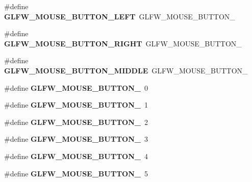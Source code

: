 \begin{DoxyCompactItemize}
\item 
\mbox{\label{group__buttons_gaf37100431dcd5082d48f95ee8bc8cd56}} 
\#define {\bfseries G\+L\+F\+W\+\_\+\+M\+O\+U\+S\+E\+\_\+\+B\+U\+T\+T\+O\+N\+\_\+\+L\+E\+FT}~G\+L\+F\+W\+\_\+\+M\+O\+U\+S\+E\+\_\+\+B\+U\+T\+T\+O\+N\+\_
\item 
\mbox{\label{group__buttons_ga3e2f2cf3c4942df73cc094247d275e74}} 
\#define {\bfseries G\+L\+F\+W\+\_\+\+M\+O\+U\+S\+E\+\_\+\+B\+U\+T\+T\+O\+N\+\_\+\+R\+I\+G\+HT}~G\+L\+F\+W\+\_\+\+M\+O\+U\+S\+E\+\_\+\+B\+U\+T\+T\+O\+N\+\_
\item 
\mbox{\label{group__buttons_ga34a4d2a701434f763fd93a2ff842b95a}} 
\#define {\bfseries G\+L\+F\+W\+\_\+\+M\+O\+U\+S\+E\+\_\+\+B\+U\+T\+T\+O\+N\+\_\+\+M\+I\+D\+D\+LE}~G\+L\+F\+W\+\_\+\+M\+O\+U\+S\+E\+\_\+\+B\+U\+T\+T\+O\+N\+\_
\item 
\mbox{\label{group__buttons_ga181a6e875251fd8671654eff00f9112e}} 
\#define {\bfseries G\+L\+F\+W\+\_\+\+M\+O\+U\+S\+E\+\_\+\+B\+U\+T\+T\+O\+N\+\_}~0
\item 
\mbox{\label{group__buttons_ga604b39b92c88ce9bd332e97fc3f4156c}} 
\#define {\bfseries G\+L\+F\+W\+\_\+\+M\+O\+U\+S\+E\+\_\+\+B\+U\+T\+T\+O\+N\+\_}~1
\item 
\mbox{\label{group__buttons_ga0130d505563d0236a6f85545f19e1721}} 
\#define {\bfseries G\+L\+F\+W\+\_\+\+M\+O\+U\+S\+E\+\_\+\+B\+U\+T\+T\+O\+N\+\_}~2
\item 
\mbox{\label{group__buttons_ga53f4097bb01d5521c7d9513418c91ca9}} 
\#define {\bfseries G\+L\+F\+W\+\_\+\+M\+O\+U\+S\+E\+\_\+\+B\+U\+T\+T\+O\+N\+\_}~3
\item 
\mbox{\label{group__buttons_gaf08c4ddecb051d3d9667db1d5e417c9c}} 
\#define {\bfseries G\+L\+F\+W\+\_\+\+M\+O\+U\+S\+E\+\_\+\+B\+U\+T\+T\+O\+N\+\_}~4
\item 
\mbox{\label{group__buttons_gae8513e06aab8aa393b595f22c6d8257a}} 
\#define {\bfseries G\+L\+F\+W\+\_\+\+M\+O\+U\+S\+E\+\_\+\+B\+U\+T\+T\+O\+N\+\_}~5
\item 

\end{DoxyCompactItemize}
